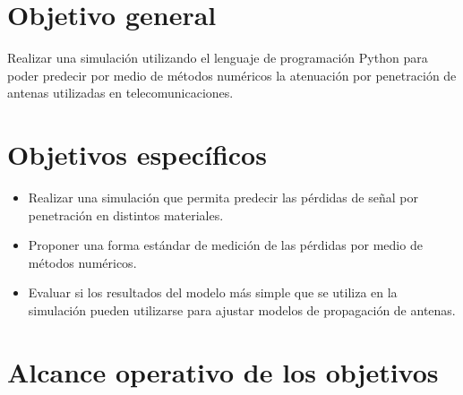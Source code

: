

\section{Objetivo general}
Realizar una simulación utilizando el lenguaje de programación Python para poder predecir por medio de métodos numéricos la atenuación por penetración de antenas utilizadas en telecomunicaciones.

\section{Objetivos específicos}
\begin{itemize}
\item Realizar una simulación que permita predecir las pérdidas de señal por penetración en distintos materiales.
\item Proponer una forma estándar de medición de las pérdidas por medio de métodos numéricos.
\item Evaluar si los resultados del modelo más simple que se utiliza en la simulación pueden utilizarse para ajustar modelos de propagación de antenas.

\end{itemize}
\section{Alcance operativo de los objetivos}

